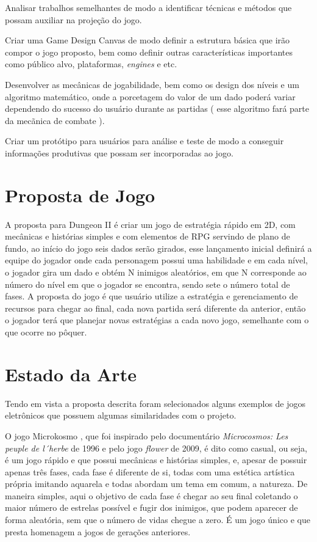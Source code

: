 \documentclass[12pt]{article}
\begin{document}
Analisar trabalhos semelhantes de modo a identificar técnicas e métodos que possam auxiliar na projeção do jogo.

Criar uma Game Design Canvas de modo  definir a estrutura básica que irão compor o jogo proposto, bem como definir outras características importantes como público alvo, plataformas, \emph{engines} e etc. 

Desenvolver as mecânicas de jogabilidade, bem como os design dos níveis e um algoritmo matemático, onde a porcetagem do valor de um dado poderá variar dependendo do sucesso do usuário durante as partidas ( esse algoritmo fará parte da mecãnica de combate ).

Criar um protótipo para usuários para análise e teste de modo a conseguir informações produtivas que possam ser incorporadas ao jogo.

\section{Proposta de Jogo}

A proposta para Dungeon II é criar um jogo de estratégia rápido em 2D, com mecânicas e histórias simples e com elementos de RPG servindo de plano de fundo, ao início do jogo seis dados serão girados, esse lançamento inicial definirá a equipe do jogador onde cada personagem possui uma habilidade e em cada nível, o jogador gira um dado e obtém N inimigos aleatórios, em que N corresponde ao número do nível em que o jogador se encontra, sendo sete o número total de fases. A proposta do jogo é que usuário utilize a estratégia e gerenciamento de recursos para chegar ao final, cada nova partida será diferente da anterior, então o jogador terá que planejar novas estratégias a cada novo jogo, semelhante com o que ocorre no pôquer.


\section{Estado da Arte}


Tendo em vista a proposta descrita foram selecionados alguns exemplos de jogos eletrônicos que possuem algumas similaridades com o projeto.

O jogo Microkosmo \cite{lunardellimikrokosmos}, que foi inspirado pelo documentário\emph{ Microcosmos: Les peuple de l´herbe} de 1996 e pelo jogo \emph{flower} de 2009, é dito como casual, ou seja, é um jogo rápido e que possui  mecânicas e histórias simples, e, apesar de possuir apenas três fases, cada fase é diferente de si, todas com uma estética artística própria imitando aquarela e  todas abordam um tema em comum, a natureza. De maneira simples, aqui o objetivo de cada fase é chegar ao seu final coletando o maior número de estrelas possível e fugir dos inimigos, que podem aparecer de forma aleatória, sem que o número de vidas chegue a zero. É um jogo único e que presta homenagem a jogos de gerações anteriores. 
\end{document}
